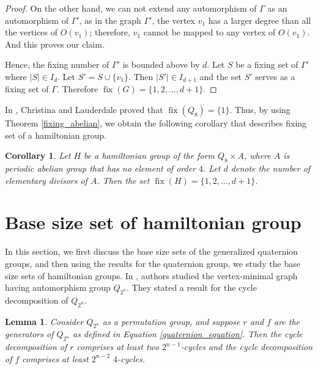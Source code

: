 \documentclass[12pt]{article}
\theoremstyle{plain}
\newtheorem{corollary}[theorem]{Corollary}
\newtheorem{lemma}[theorem]{Lemma}
\theoremstyle{definition}
\newcommand{\fix}{\mathop{\mathrm{fix}}}
\begin{document}
\begin{proof}
		On the other hand, we can not extend any automorphism of $\Gamma$ as an automorphism of $\Gamma'$, as in the graph $\Gamma'$, the vertex $v_1$ has a larger degree than all the vertices of $O(v_{1})$; therefore, $v_1$ cannot be mapped to any vertex of $O(v_{1})$. And this proves our claim.
		
		Hence, the fixing number of $\Gamma'$ is bounded above by $d$. Let $S$ be a fixing set of $\Gamma'$ where $|S|\in I_d$.	Let $S' = S \cup \{v_{1}\}$. Then $|S'|\in I_{d+1}$ and the set $S'$ serves as a fixing set of $\Gamma$. Therefore $\fix(G) = \{1,2,\ldots,d+1\}$. \end{proof} 
	In \cite{lklgchh}, Christina and Lauderdale proved that $\fix(Q_8)=\{1\}$. Thus, by using Theorem \ref{fixing_abelian}, we obtain the following corollary that describes fixing set of a hamiltonian group.
	
	
	\begin{corollary}
		\label{ham_main3}
		Let $H$ be a hamiltonian group of the form $Q_{8} \times A$, where $A$ is periodic abelian group that has no element of order $4$. Let $d$ denote the number of elementary divisors of $A$. Then the set $\fix(H) = \{1,2,\ldots,d+1\}$.
	\end{corollary}	
	
	\section{Base size set of hamiltonian group}
In this section, we first discuss the base size sets of the generalized quaternion groups, and then using the results for the quaternion group, we study the base size sets of hamiltonian groups. In \cite{lklgchh}, authors studied the vertex-minimal graph having automorphism group $Q_{2^{n}}$. They stated a result for the cycle decomposition of $Q_{2^{n}}$. 
	\begin{lemma} \cite{lklgchh}
		\label{cycle_quaternion}
		Consider $Q_{2^{n}}$ as a permutation group, and suppose $r$ and $f$ are the generators of $Q_{2^{n}}$ as defined in Equation \ref{quaternion_equation}. Then the cycle decomposition of $r$ comprises at least two $2^{n-1}$-cycles and the cycle decomposition of $f$ comprises at least $2^{n-2}$ $4$-cycles.
	\end{lemma}
	
\end{document}
